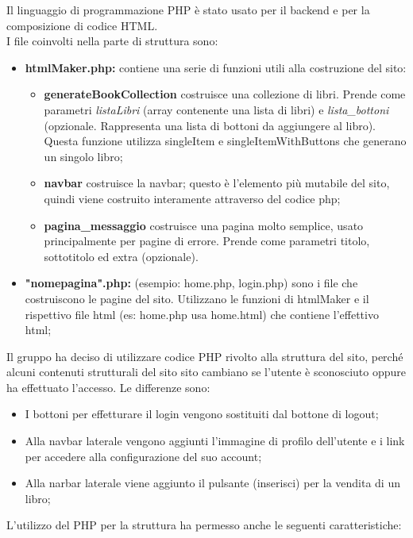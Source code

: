 Il linguaggio di programmazione PHP è stato usato per il backend e per la composizione di codice HTML.\\
I file coinvolti nella parte di struttura sono:
\begin{itemize}
    \item \textbf{htmlMaker.php:} contiene una serie di funzioni utili alla costruzione del sito:\label{htmlmaker}
        \begin{itemize}
            \item \textbf{generateBookCollection} costruisce una collezione di libri. Prende come parametri \textit{listaLibri} (array contenente una lista di libri) e \textit{lista\_bottoni} (opzionale. Rappresenta una lista di bottoni da aggiungere al libro). Questa funzione utilizza singleItem e singleItemWithButtons che generano un singolo libro;
            \item \textbf{navbar} costruisce la navbar; questo è l'elemento più mutabile del sito, quindi viene costruito interamente attraverso del codice php;
            \item \textbf{pagina\_messaggio} costruisce una pagina molto semplice, usato principalmente per pagine di errore. Prende come parametri titolo, sottotitolo ed extra (opzionale).
        \end{itemize}
    \item \textbf{"nomepagina".php:} (esempio: home.php, login.php) sono i file che costruiscono le pagine del sito. Utilizzano le funzioni di htmlMaker e il rispettivo file html (es: home.php usa home.html) che contiene l'effettivo html; 
\end{itemize}
Il gruppo ha deciso di utilizzare codice PHP rivolto alla struttura del sito, perché alcuni contenuti strutturali del sito sito cambiano se l'utente è sconosciuto oppure ha effettuato l'accesso. Le differenze sono:
\begin{itemize}
    \item I bottoni per effetturare il login vengono sostituiti dal bottone di logout;
    \item Alla navbar laterale vengono aggiunti l'immagine di profilo dell'utente e i link per accedere alla configurazione del suo account;
    \item Alla narbar laterale viene aggiunto il pulsante (inserisci) per la vendita di un libro;
\end{itemize}
L'utilizzo del PHP per la struttura ha permesso anche le seguenti caratteristiche:
